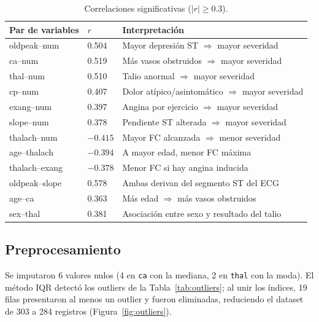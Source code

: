 \documentclass[11pt,a4paper]{article}
\begin{document}
\begin{table}[H]
  \centering
  \caption{Correlaciones significativas ($|r| \geq 0.3$).}
  \label{tab:correlaciones}
  \small
  \begin{tabular}{@{}lll@{}}
    \toprule
    \textbf{Par de variables} & $r$ & \textbf{Interpretación} \\
    \midrule
    oldpeak--num & 0.504 & Mayor depresión ST $\Rightarrow$ mayor severidad \\
    ca--num & 0.519 & Más vasos obstruidos $\Rightarrow$ mayor severidad \\
    thal--num & 0.510 & Talio anormal $\Rightarrow$ mayor severidad \\
    cp--num & 0.407 & Dolor atípico/asintomático $\Rightarrow$ mayor severidad \\
    exang--num & 0.397 & Angina por ejercicio $\Rightarrow$ mayor severidad \\
    slope--num & 0.378 & Pendiente ST alterada $\Rightarrow$ mayor severidad \\
    thalach--num & $-0.415$ & Mayor FC alcanzada $\Rightarrow$ menor severidad \\
    age--thalach & $-0.394$ & A mayor edad, menor FC máxima \\
    thalach--exang & $-0.378$ & Menor FC si hay angina inducida \\
    oldpeak--slope & 0.578 & Ambas derivan del segmento ST del ECG \\
    age--ca & 0.363 & Más edad $\Rightarrow$ más vasos obstruidos \\
    sex--thal & 0.381 & Asociación entre sexo y resultado del talio \\
    \bottomrule
  \end{tabular}
\end{table}

\subsection{Preprocesamiento}

Se imputaron 6 valores nulos (4 en \texttt{ca} con la mediana, 2 en \texttt{thal} con la
moda). El método IQR detectó los outliers de la Tabla~\ref{tab:outliers}; al unir los índices,
19 filas presentaron al menos un outlier y fueron eliminadas, reduciendo el dataset de 303 a
284 registros (Figura~\ref{fig:outliers}).
\end{document}
